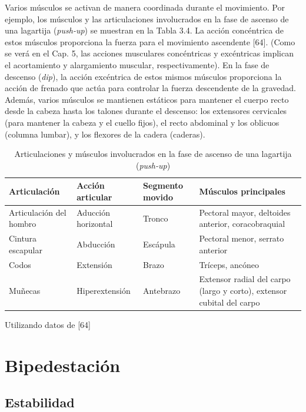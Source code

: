 \documentclass[12pt]{book}
\begin{document}
Varios músculos se activan de manera coordinada durante el movimiento. Por ejemplo, los músculos y las articulaciones involucrados en la fase de ascenso de una lagartija (\textit{push-up}) se muestran en la Tabla 3.4. La acción concéntrica de estos músculos proporciona la fuerza para el movimiento ascendente [64]. (Como se verá en el Cap. 5, las acciones musculares concéntricas y excéntricas implican el acortamiento y alargamiento muscular, respectivamente). En la fase de descenso (\textit{dip}), la acción excéntrica de estos mismos músculos proporciona la acción de frenado que actúa para controlar la fuerza descendente de la gravedad. Además, varios músculos se mantienen estáticos para mantener el cuerpo recto desde la cabeza hasta los talones durante el descenso: los extensores cervicales (para mantener la cabeza y el cuello fijos), el recto abdominal y los oblicuos (columna lumbar), y los flexores de la cadera (caderas).

\begin{table}[htbp]
\centering
\caption{Articulaciones y músculos involucrados en la fase de ascenso de una lagartija (\textit{push-up})}
\label{tab:34}
\begin{tabularx}{\textwidth}{lXXX}
\toprule
\textbf{Articulación} & \textbf{Acción articular} & \textbf{Segmento movido} & \textbf{Músculos principales} \\
\midrule
Articulación del hombro & Aducción horizontal & Tronco & Pectoral mayor, deltoides anterior, coracobraquial \\
Cintura escapular & Abducción & Escápula & Pectoral menor, serrato anterior \\
Codos & Extensión & Brazo & Tríceps, ancóneo \\
Muñecas & Hiperextensión & Antebrazo & Extensor radial del carpo (largo y corto), extensor cubital del carpo \\
\bottomrule
\end{tabularx}
\begin{flushleft}
    \small Utilizando datos de [64]
\end{flushleft}
\end{table}

\section{Bipedestación}

\subsection{Estabilidad}
\end{document}
